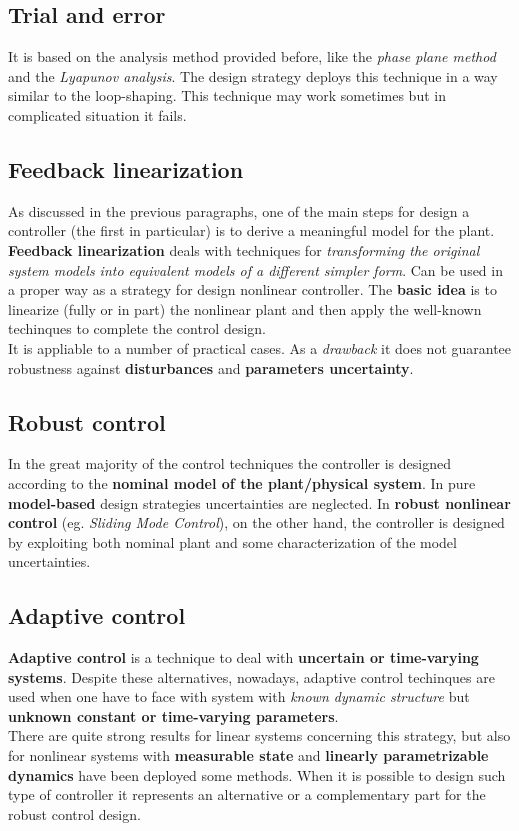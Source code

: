 \subsection{Trial and error}
It is based on the analysis method provided before, like the \textit{phase plane method} and the \textit{Lyapunov analysis}. The design strategy deploys this technique in a way similar to the loop-shaping. This technique may work sometimes but in complicated situation it fails.

\subsection{Feedback linearization}
As discussed in the previous paragraphs, one of the main steps for design a controller (the first in particular) is to derive a meaningful model for the plant. \textbf{Feedback linearization} deals with techniques for \textit{transforming the original system models into equivalent models of a different simpler form}. Can be used in a proper way as a strategy for design nonlinear controller. The \textbf{basic idea} is to linearize (fully or in part) the nonlinear plant and  then apply the well-known techinques to complete the control design.\\
It is  appliable to a number of practical cases. As a \textit{drawback} it does not guarantee robustness against \textbf{disturbances} and \textbf{parameters uncertainty}.
\subsection{Robust control}
In the great majority of the control techniques the controller is designed according to the \textbf{nominal model of the plant/physical system}. In pure \textbf{model-based} design strategies uncertainties are neglected. In \textbf{robust nonlinear control} (eg. \textit{Sliding Mode Control}), on the other hand, the controller is designed by exploiting both nominal plant and some characterization of the model uncertainties.\\


\subsection{Adaptive control}
\textbf{Adaptive control} is a technique to deal with \textbf{uncertain or time-varying systems}. Despite these alternatives, nowadays, adaptive control techinques are used when one have to face with system with \textit{known dynamic structure} but \textbf{unknown constant or time-varying parameters}. \\
There are quite strong results for linear systems concerning this strategy, but  also for nonlinear systems with \textbf{measurable state} and \textbf{linearly parametrizable dynamics} have been deployed some methods. When it is possible to design such type of controller it represents an alternative or a complementary part for the robust control design. 

